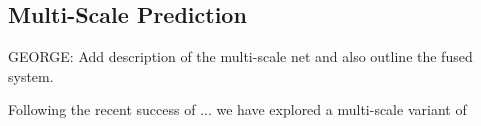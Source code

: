 \subsection{Multi-Scale Prediction}
\label{sec:multiscale}

GEORGE: Add description of the multi-scale net and also outline
  the fused system.

Following the recent success of ... we have explored a multi-scale variant of 

